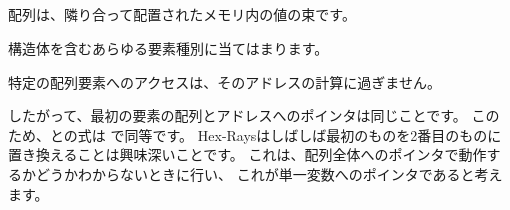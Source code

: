 ﻿\subsection{\Conclusion{}}

配列は、隣り合って配置されたメモリ内の値の束です。

構造体を含むあらゆる要素種別に当てはまります。

特定の配列要素へのアクセスは、そのアドレスの計算に過ぎません。

したがって、最初の要素の配列とアドレスへのポインタは同じことです。 
このため、との式は \CCpp で同等です。 
Hex-Raysはしばしば最初のものを2番目のものに置き換えることは興味深いことです。 
これは、配列全体へのポインタで動作するかどうかわからないときに行い、
これが単一変数へのポインタであると考えます。
